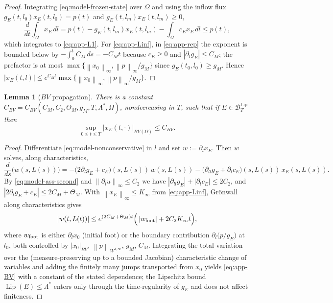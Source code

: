 \documentclass[pdflatex,sn-mathphys-num]{sn-jnl}
\theoremstyle{thmstyleone}
\newtheorem{lemma}[theorem]{Lemma}
\theoremstyle{definition}
\theoremstyle{remark}
\newcommand{\Om}{\Omega}
\newcommand{\Btl}{\mathcal{B}_T^{\mathrm{Lip}}}
\newcommand{\Lip}{\operatorname{Lip}}
\newcommand{\norm}[1]{\left\lVert#1\right\rVert}
\newcommand{\abs}[1]{\left\lvert#1\right\rvert}
\numberwithin{equation}{section}
\begin{document}
\begin{proof}
Integrating \eqref{eq:model-frozen-state} over $\Om$ and using the inflow flux
$g_E(t,l_0)x_E(t,l_0)=p(t)$ and $g_E(t,l_m)x_E(t,l_m)\ge0$,
\[
\frac{d}{dt}\int_\Om x_E\,dl
=p(t)-g_E(t,l_m)x_E(t,l_m)-\int_\Om c_E x_E\,dl
\le p(t),
\]
which integrates to \eqref{eq:app-L1}. For \eqref{eq:app-Linf}, in
\eqref{eq:app-rep} the exponent is bounded below by $-\int_0^t C_M\,ds=-C_Mt$
because $c_E\ge0$ and $\abs{\partial_l g_E}\le C_M$; the prefactor is at most
$\max\{\norm{x_0}_\infty,\norm{p}_\infty/g_M\}$ since $g_E(t_0,l_0)\ge g_M$. Hence
$\abs{x_E(t,l)}\le e^{C_Mt}\max\{\norm{x_0}_\infty,\norm{p}_\infty/g_M\}$.
\end{proof}

\begin{lemma}[$BV$ propagation]
\label{lem:app-bv}
There is a constant $C_{BV}=C_{BV}(C_M,C_2,\Theta_M,g_M,T,\Lambda^*,\Om)$,
nondecreasing in $T$, such that if $E\in\Btl$ then
\begin{equation}
\label{eq:app-BV}
\sup_{0\le t\le T}\abs{x_E(t,\cdot)}_{BV(\Om)}\le C_{BV}.
\end{equation}
\end{lemma}

\begin{proof}
Differentiate \eqref{eq:model-nonconservative} in $l$ and set $w:=\partial_l x_E$.
Then $w$ solves, along characteristics,
\[
\frac{d}{ds}\big(w(s,L(s))\big)
=-\big(2\partial_l g_E+c_E\big)(s,L(s))\,w(s,L(s))
-\big(\partial_{ll}g_E+\partial_l c_E\big)(s,L(s))\,x_E(s,L(s)).
\]
By \eqref{eq:model-ass-second} and $\norm{\partial_l u}_\infty\le C_2$ we have
$\abs{\partial_{ll}g_E}+\abs{\partial_l c_E}\le 2C_2$, and
$\abs{2\partial_l g_E+c_E}\le 2C_M+\Theta_M$. With $\norm{x_E}_\infty\le K_\infty$
from \eqref{eq:app-Linf}, Gr\"onwall along characteristics gives
\[
\abs{w(t,L(t))}\le
e^{(2C_M+\Theta_M)t}\Big(\abs{w_{\rm foot}}+2C_2K_\infty t\Big),
\]
where $w_{\rm foot}$ is either $\partial_l x_0$ (initial foot) or the boundary
contribution $\partial_l\big(p/g_E\big)$ at $l_0$, both controlled by
$\abs{x_0}_{BV}$, $\norm{p}_{W^{1,\infty}}$, $g_M$, $C_M$. Integrating the
total variation over the (measure-preserving up to a bounded Jacobian)
characteristic change of variables and adding the finitely many jumps transported
from $x_0$ yields \eqref{eq:app-BV} with a constant of the stated dependence; the
Lipschitz bound $\Lip(E)\le\Lambda^*$ enters only through the time-regularity of
$g_E$ and does not affect finiteness.
\end{proof}
\end{document}
